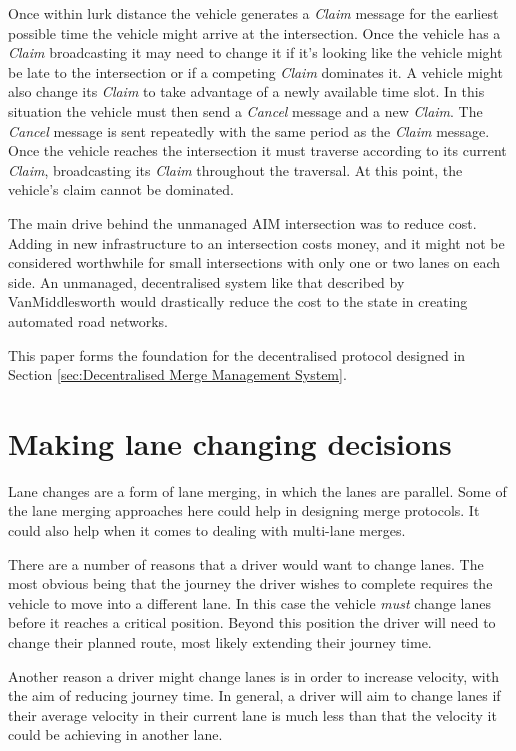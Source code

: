 Once within lurk distance the vehicle generates a \emph{Claim} message for the earliest possible time the vehicle might arrive at the intersection. Once the vehicle has a \emph{Claim} broadcasting it may need to change it if it's looking like the vehicle might be late to the intersection or if a competing \emph{Claim} dominates it. A vehicle might also change its \emph{Claim} to take advantage of a newly available time slot. In this situation the vehicle must then send a \emph{Cancel} message and a new \emph{Claim}. The \emph{Cancel} message is sent repeatedly with the same period as the \emph{Claim} message. Once the vehicle reaches the intersection it must traverse according to its current \emph{Claim}, broadcasting its \emph{Claim} throughout the traversal. At this point, the vehicle's claim cannot be dominated.

The main drive behind the unmanaged AIM intersection was to reduce cost. Adding in new infrastructure to an intersection costs money, and it might not be considered worthwhile for small intersections with only one or two lanes on each side. An unmanaged, decentralised system like that described by VanMiddlesworth would drastically reduce the cost to the state in creating automated road networks.

This paper forms the foundation for the decentralised protocol designed in Section \ref{sec:Decentralised Merge Management System}.

\section{Making lane changing decisions}
\label{sec:Making lane changing decisions}
Lane changes are a form of lane merging, in which the lanes are parallel. Some of the lane merging approaches here could help in designing merge protocols. It could also help when it comes to dealing with multi-lane merges.

There are a number of reasons that a driver would want to change lanes. The most obvious being that the journey the driver wishes to complete requires the vehicle to move into a different lane. In this case the vehicle \emph{must} change lanes before it reaches a critical position. Beyond this position the driver will need to change their planned route, most likely extending their journey time. 

Another reason a driver might change lanes is in order to increase velocity, with the aim of reducing journey time. In general, a driver will aim to change lanes if their average velocity in their current lane is much less than that the velocity it could be achieving in another lane.

